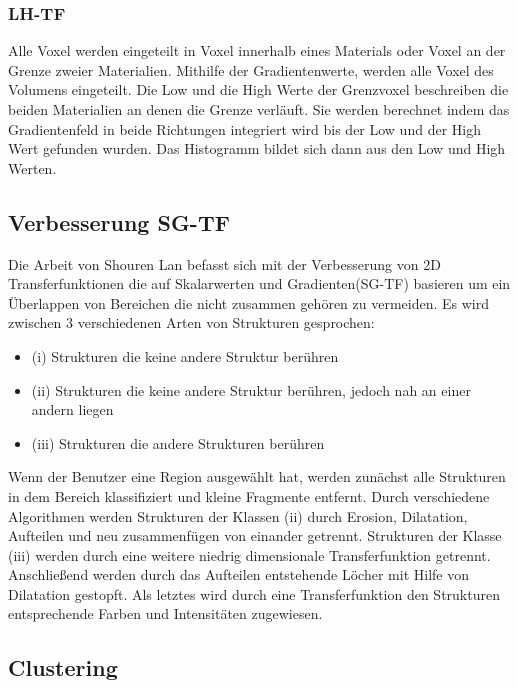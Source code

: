 \documentclass{article}
\begin{document}
\subsubsection{LH-TF}

Alle Voxel werden eingeteilt in Voxel innerhalb eines Materials oder Voxel an der Grenze zweier Materialien. Mithilfe der Gradientenwerte, werden alle Voxel des Volumens eingeteilt. Die Low und die High Werte der Grenzvoxel beschreiben die beiden Materialien an denen die Grenze verläuft. Sie werden berechnet indem das Gradientenfeld in beide Richtungen integriert wird bis der Low und der High Wert gefunden wurden. 
\newline
Das Histogramm bildet sich dann aus den Low und High Werten. \cite{sereda2006visualization}


\subsection{Verbesserung SG-TF}

Die Arbeit von Shouren Lan \cite{lan2017improving} befasst sich mit der Verbesserung von 2D Transferfunktionen die auf Skalarwerten und Gradienten(SG-TF) basieren um ein Überlappen von Bereichen die nicht zusammen gehören zu vermeiden.
\newline
Es wird zwischen 3 verschiedenen Arten von Strukturen gesprochen:
\begin{itemize}
\item (i) Strukturen die keine andere Struktur berühren
\item (ii) Strukturen die keine andere Struktur berühren, jedoch nah an einer andern liegen
\item (iii) Strukturen die andere Strukturen berühren
\end{itemize} 
Wenn der Benutzer eine Region ausgewählt hat, werden zunächst alle Strukturen in dem Bereich klassifiziert und kleine Fragmente entfernt. Durch verschiedene Algorithmen werden Strukturen der Klassen (ii) durch Erosion, Dilatation, Aufteilen und neu zusammenfügen von einander getrennt. Strukturen der Klasse (iii) werden durch eine weitere niedrig dimensionale Transferfunktion getrennt. Anschließend werden durch das Aufteilen entstehende Löcher mit Hilfe von Dilatation gestopft. Als letztes wird durch eine Transferfunktion den Strukturen entsprechende Farben und Intensitäten zugewiesen.


\subsection{Clustering}
\end{document}
